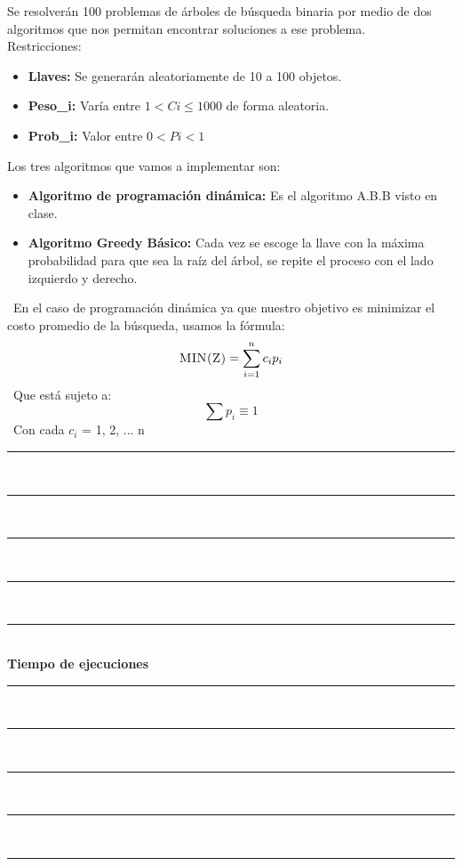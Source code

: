 \documentclass[10pt,letterpaper]{article}
\begin{document}
 \newline \newline 
Se resolverán 100 problemas de árboles de búsqueda binaria por medio de dos algoritmos que nos 
        permitan encontrar soluciones a ese problema. 
        \ \ \newline \newline 
        Restricciones: 
        \begin{itemize} 
        \item \textbf{Llaves:} Se generarán aleatoriamente de 10 a 100 objetos. 
        \item \textbf{Peso_{i}:} Varía entre $1 < C{i} \leq 1000 $ de forma aleatoria.
        \item \textbf{Prob_{i}:} Valor entre $ 0 < P{i} < 1 $ 
        \end{itemize} 
        Los tres algoritmos que vamos a implementar son: 
        \begin{itemize} 
        \item \textbf{Algoritmo de programación dinámica:} Es el algoritmo A.B.B visto en clase. 
        \item \textbf{Algoritmo Greedy Básico:} Cada vez se escoge la llave con la máxima 
         probabilidad para que sea la raíz del árbol, se repite el proceso con el lado izquierdo y derecho. 
        \end{itemize} 
        \ En el caso de programación dinámica ya que nuestro objetivo es minimizar el costo promedio de la búsqueda, usamos la fórmula: 
        \[ \textsc{\normalsize MIN(Z)}\\[0.5cm] = \sum_{i=1}^{n}c_{i}p_{i} \] 
        \ Que está sujeto a:  
        \[ \sum p_{i} \equiv 1 \] 
        \ Con cada $c_{i}$ = 1, 2, ... n  
        \ \ \newline \newline 
{}
\newpage 
\begin{center}
\newcommand{\HRule}{\rule{\linewidth}{0.5mm}}
\center
\HRule\\[6cm]
\HRule\\[0.4cm]
\HRule\\[0.4cm]
\HRule\\[0.4cm]
\HRule\\[0.4cm]
{\centering \Huge\bfseries Tiempo de ejecuciones}\\[0.4cm]
\HRule\\[0.4cm]
\HRule\\[0.4cm]
\HRule\\[0.4cm]
\HRule\\[6cm]
\HRule
\end{center}
\end{document}
